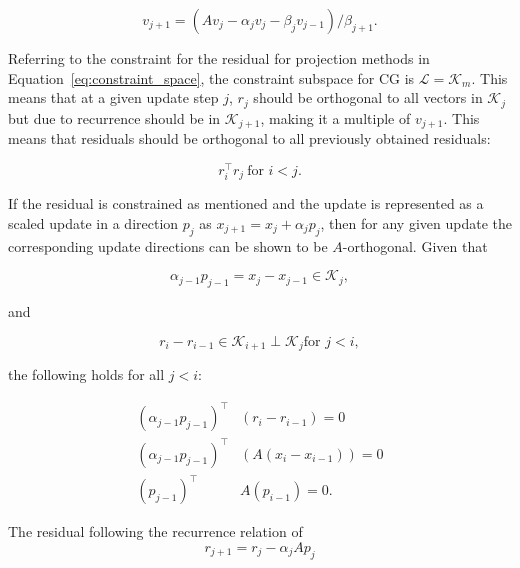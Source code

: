 \begin{equation}
    v_{j+1} = \left(A v_j - \alpha_j v_j - \beta_j v_{j-1}\right)/\beta_{j+1}.
\end{equation}

Referring to the constraint for the residual for projection methods in Equation~\ref{eq:constraint_space}, the constraint subspace for CG is $\mathcal{L} = \mathcal{K}_m$. This means that at a given update step $j$, $r_j$ should be orthogonal to all vectors in $\mathcal{K}_j$ but due to recurrence should be in $\mathcal{K}_{j+1}$, making it a multiple of $v_{j+1}$. This means that residuals should be orthogonal to all previously obtained residuals:

\begin{equation}
    r_i^\top r_j\ \text{for $i < j$}.
\end{equation}

If the residual is constrained as mentioned and the update is represented as a scaled update in a direction $p_j$ as $x_{j+1} = x_{j} + \alpha_j p_j$, then for any given update the corresponding update directions can be shown to be $A$-orthogonal. Given that 

\begin{equation}
	\alpha_{j-1}p_{j-1} = x_{j} - x_{j-1} \in \mathcal{K}_j,
\end{equation} 

and 

\begin{equation}
r_i - r_{i-1} \in \mathcal{K}_{i+1} \perp \mathcal{K}_j \text{for $j < i$}, 
\end{equation}

the following holds for all $j < i$:

\begin{equation}
    \label{eq:A_orth}
    \begin{aligned}
    \left(\alpha_{j-1}p_{j-1}\right)^\top& \left(r_i - r_{i-1}\right) = 0 \\
    \left(\alpha_{j-1}p_{j-1}\right)^\top &\left(A \left(x_i - x_{i-1}\right)\right) = 0 \\
    \left(p_{j-1}\right)^\top& A \left(p_{i-1}\right) = 0.
    \end{aligned}
\end{equation}

The residual following the recurrence relation of
\begin{equation}
    r_{j+1} = r_j - \alpha_j A p_j
\end{equation}

